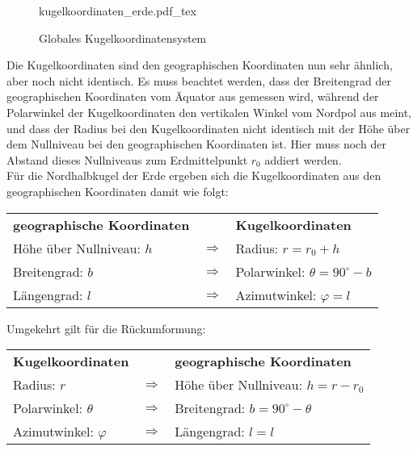 \begin{figure}[H]
	\centering
	\def\svgwidth{8cm}
	{kugelkoordinaten_erde.pdf_tex}
	\caption{Globales Kugelkoordinatensystem}
	\label{fig:kugelkoordinaten_erde}
\end{figure}

\noindent Die Kugelkoordinaten sind den geographischen Koordinaten nun sehr ähnlich, aber noch nicht identisch. Es muss beachtet werden, dass der Breitengrad der geographischen Koordinaten vom Äquator aus gemessen wird, während der Polarwinkel der Kugelkoordinaten den vertikalen Winkel vom Nordpol aus meint, und dass der Radius bei den Kugelkoordinaten nicht identisch mit der Höhe über dem Nullniveau bei den geographischen Koordinaten ist. Hier muss noch der Abstand dieses Nullniveaus zum Erdmittelpunkt $r_0$ addiert werden.\\
Für die Nordhalbkugel der Erde ergeben sich die Kugelkoordinaten aus den geographischen Koordinaten damit wie folgt:
\begin{center}
	\begin{tabular}{l P{2cm} l}
		\textbf{geographische Koordinaten} & & \textbf{Kugelkoordinaten}\\[0.2cm]
		Höhe über Nullniveau: $h$  & $\Longrightarrow$ & Radius: $r = r_0+h$ \\
		Breitengrad: $b$ & $\Longrightarrow$ & Polarwinkel: $\theta = 90^\circ - b$\\
		Längengrad: $l$ & $\Longrightarrow$ & Azimutwinkel: $\varphi = l$\\
	\end{tabular}
\end{center}

\noindent Umgekehrt gilt für die Rückumformung:
\begin{center}
	\begin{tabular}{l P{2cm} l}
		\textbf{Kugelkoordinaten} & & \textbf{geographische Koordinaten}\\[0.2cm]
		Radius: $r$ & $\Longrightarrow$ & Höhe über Nullniveau: $h = r - r_0$\\
		Polarwinkel: $\theta$ & $\Longrightarrow$ & Breitengrad: $b = 90^\circ - \theta$\\
		Azimutwinkel: $\varphi$ & $\Longrightarrow$ & Längengrad: $l = l$\\
	\end{tabular}
\end{center}
